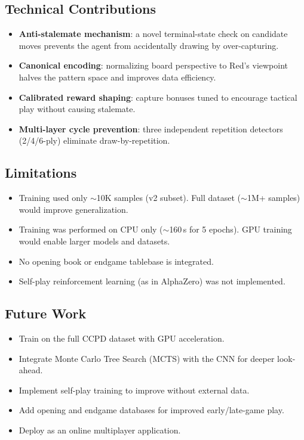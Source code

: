\documentclass[a4paper,12pt]{article}
\begin{document}
\subsection{Technical Contributions}

\begin{itemize}
    \item \textbf{Anti-stalemate mechanism}: a novel terminal-state check on candidate moves prevents the agent from accidentally drawing by over-capturing.
    \item \textbf{Canonical encoding}: normalizing board perspective to Red's viewpoint halves the pattern space and improves data efficiency.
    \item \textbf{Calibrated reward shaping}: capture bonuses tuned to encourage tactical play without causing stalemate.
    \item \textbf{Multi-layer cycle prevention}: three independent repetition detectors (2/4/6-ply) eliminate draw-by-repetition.
\end{itemize}

\subsection{Limitations}

\begin{itemize}
    \item Training used only $\sim$10K samples (v2 subset). Full dataset ($\sim$1M+ samples) would improve generalization.
    \item Training was performed on CPU only ($\sim$160\,s for 5 epochs). GPU training would enable larger models and datasets.
    \item No opening book or endgame tablebase is integrated.
    \item Self-play reinforcement learning (as in AlphaZero) was not implemented.
\end{itemize}

\subsection{Future Work}

\begin{itemize}
    \item Train on the full CCPD dataset with GPU acceleration.
    \item Integrate Monte Carlo Tree Search (MCTS) with the CNN for deeper look-ahead.
    \item Implement self-play training to improve without external data.
    \item Add opening and endgame databases for improved early/late-game play.
    \item Deploy as an online multiplayer application.
\end{itemize}
\end{document}

